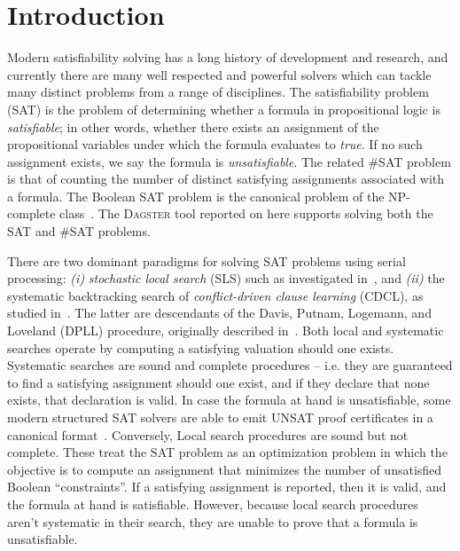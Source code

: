 \documentclass[
10pt, %
a4paper, %
oneside, %
headinclude,footinclude, %
BCOR5mm, %
]{scrartcl}
\begin{document}
\section{Introduction}

Modern satisfiability solving has a long history of development and research, and currently there are many well respected and powerful solvers which can tackle many distinct problems from a range of disciplines.
The satisfiability problem (SAT) is the problem of determining whether a formula in propositional logic is {\em satisfiable}; in other words, whether there exists an assignment of the propositional variables under which the formula evaluates to {\em true}.
If no such assignment exists, we say the formula is {\em unsatisfiable}.
The related $\#$SAT problem is that of counting the number of distinct satisfying assignments associated with a formula.
The Boolean SAT problem is the canonical problem of the NP-complete class~\cite{10.1145/800157.805047,Kar72}.
The \textsc{Dagster} tool reported on here supports solving both the SAT and $\#$SAT problems. 

There are two dominant paradigms for solving SAT problems using serial processing: {\em (i)} {\em stochastic local search} (SLS) such as investigated in~\cite{pham:etal:2008,pham:etal:2007,balint:schoning:14}, and  {\em (ii)} the systematic backtracking search of {\em conflict-driven clause learning} (CDCL), as studied in~\cite{audemard:and:simon:2009,biere:2008}.
The latter are descendants of the Davis, Putnam, Logemann, and Loveland (DPLL) procedure, originally described in~\cite{10.1145/368273.368557}.
Both local and systematic searches operate by computing a satisfying valuation should one exists.
Systematic searches are sound and complete procedures -- i.e. they are guaranteed to find a satisfying assignment should one exist, and if they declare that none exists, that declaration is valid.
In case the formula at hand is unsatisfiable, some modern structured SAT solvers are able to emit UNSAT proof certificates in a canonical format~\cite{10.1007/978-3-319-09284-3_31}.
Conversely, Local search procedures are sound but not complete.
These treat the SAT problem as an optimization problem in which the objective is to compute an assignment that minimizes the number of unsatisfied Boolean ``constraints''.
If a satisfying assignment is reported, then it is valid, and the formula at hand is satisfiable.
However, because local search procedures aren't systematic in their search, they are unable to prove that a formula is unsatisfiable.
\end{document}
